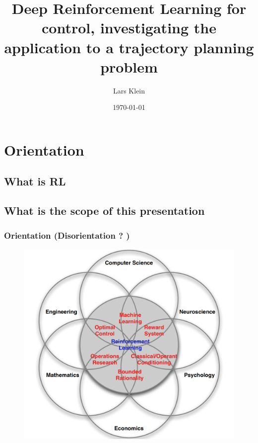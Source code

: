 \documentclass{beamer}
\title[Short title]{Deep Reinforcement Learning for control, investigating the application to a trajectory planning problem } %
\author{Lars Klein} %
\institute[PEM] %
{
RWTH \\ %
\medskip
\textit{lars.klein@rwth-aachen.de} %
}
\date{\today} %
\begin{document}
\begin{frame}
\titlepage %
\end{frame}



\section{Orientation}
\subsection{What is RL}
\subsection{What is the scope of this presentation}

\begin{frame}
\frametitle{Orientation (Disorientation ? )}
\begin{figure}
\includegraphics[height=0.7\textheight]{venn_rl}
\end{figure}
\end{frame}
\end{document}
